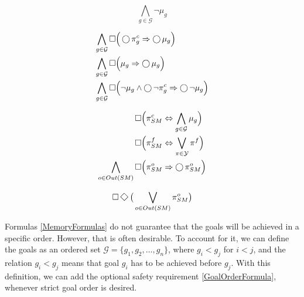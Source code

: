\begin{equation}\label{MemoryInitialCondition}
	\bigwedge \limits_{g \in \mathcal{G}} \lnot \mu_g 
\end{equation}

\begin{subequations}
	\label{MemoryFormulas}
	\begin{align}
		\bigwedge \limits_{g \in \mathcal{G}} \operatorname{\Box}& \Big( \operatorname{\bigcirc} \pi_g^c \Rightarrow \operatorname{\bigcirc} \mu_g \Big) \label{MemoryFormula1}\\
		\bigwedge \limits_{g \in \mathcal{G}}\operatorname{\Box}& \Big(  \mu_g \Rightarrow \operatorname{\bigcirc} \mu_g \Big) \label{MemoryFormula2}\\
		\bigwedge \limits_{g \in \mathcal{G}}\operatorname{\Box}& \Big(  \lnot \mu_g \wedge \operatorname{\bigcirc} \lnot \pi_g^c \Rightarrow \operatorname{\bigcirc} \lnot \mu_g \Big) \label{MemoryFormula3}
\end{align}
\end{subequations}

\begin{subequations}
	\label{SMOutcomeFormulas}
	\begin{align}
		\operatorname{\Box}& \Big( \pi_{SM}^{c} \Leftrightarrow \bigwedge \limits_{g \in \mathcal{G}} \mu_g \Big) \label{SuccessfulOutcomeFormula}\\
		\operatorname{\Box}& \Big( \pi_{SM}^{f} \Leftrightarrow \bigvee \limits_{\pi \in \mathcal{Y}} \pi^f \Big) \label{FailedOutcomeFormula}\\
		\bigwedge \limits_{o \in Out(SM)} \operatorname{\Box}& \Big( \pi_{SM}^{o} \Rightarrow \operatorname{\bigcirc} \pi_{SM}^{o} \Big) \label{SMOutcomePersistenceFormula}
	\end{align}
\end{subequations}

\begin{equation}\label{SuccessLivenessFormula}
	\LTLG \LTLF \big( \bigvee \limits_{o \in Out(SM)} \pi_{SM}^{o} \big)
\end{equation}

Formulas \eqref{MemoryFormulas} do not guarantee that the goals will be achieved in a specific order.
However, that is often desirable. 
To account for it, we can define the goals as an ordered set $\mathcal{G} = \{ g_1, g_2, \ldots, g_n \}$, where $g_i < g_j$ for $i<j$, and the relation $g_i < g_j$ means that goal $g_i$ has to be achieved before $g_j$.
With this definition, we can add the optional safety requirement \eqref{GoalOrderFormula}, whenever strict goal order is desired.

